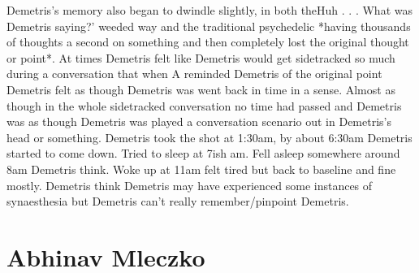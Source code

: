 \documentclass[12pt]{book}
\begin{document}
Demetris's memory also began to dwindle slightly, in both theHuh . . .  What was Demetris saying?' weeded way and the traditional psychedelic *having thousands of thoughts a second on something and then completely lost the original thought or point*. At times Demetris felt like Demetris would get sidetracked so much during a conversation that when A reminded Demetris of the original point Demetris felt as though Demetris was went back in time in a sense. Almost as though in the whole sidetracked conversation no time had passed and Demetris was as though Demetris was played a conversation scenario out in Demetris's head or something. Demetris took the shot at 1:30am, by about 6:30am Demetris started to come down. Tried to sleep at 7ish am. Fell asleep somewhere around 8am Demetris think. Woke up at 11am felt tired but back to baseline and fine mostly. Demetris think Demetris may have experienced some instances of synaesthesia but Demetris can't really remember/pinpoint Demetris.



\chapter{Abhinav Mleczko}
\end{document}
